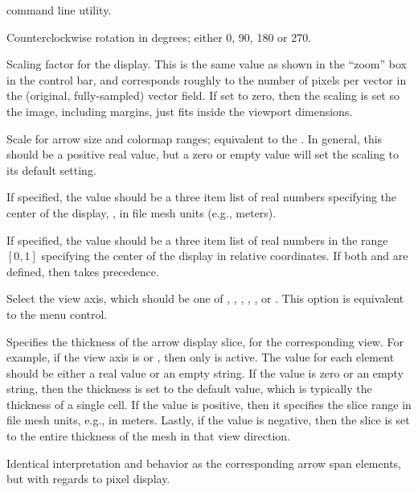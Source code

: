 \begin{description}
  command line
 utility.
\item[\optkey{misc,rotation}]
 Counterclockwise rotation in degrees; either 0, 90, 180 or 270.
\item[\optkey{misc,zoom}]
 Scaling factor for the display.  This is the same value as shown in the
 ``zoom'' box in the  control bar,
 and corresponds roughly to the number of pixels per vector in the
 (original, fully-sampled) vector field.  If set to zero, then
 the scaling is set so the image, including margins, just fits inside
 the viewport dimensions.
\item[\optkey{misc,datascale}]
 Scale for arrow size and colormap ranges; equivalent to the
 .  In general,
 this should be a positive real value, but a zero or empty value will
 set the scaling to its default setting.
\item[\optkey{misc,centerpt}]
 If specified, the value should be a three item list of real numbers
 specifying the center of the display, , in
 file mesh units (e.g., meters).
\item[\optkey{misc,relcenterpt}]
 If specified, the value should be a three item list of real numbers in
 the range $[0,1]$ specifying the center of the display in relative
 coordinates.  If both  and  are
 defined, then  takes precedence.
\item[\optkey{viewaxis}]
 Select the view axis, which should be one of , , ,
 , , or .  This option is equivalent to the
  menu control.
\item[\optkey{viewaxis,xarrowspan}, \optkey{viewaxis,yarrowspan},
      \optkey{viewaxis,zarrowspan}]
 Specifies the thickness of the arrow display slice, for the
 corresponding view.  For example, if the view axis is  or
 , then only  is active.  The value
 for each element should be either a real value or an empty string.  If
 the value is zero or an empty string, then the thickness is set to the
 default value, which is typically the thickness of a single cell.  If
 the value is positive, then it specifies the slice range in file mesh
 units, e.g., in meters.  Lastly, if the value is negative, then the
 slice is set to the entire thickness of the mesh in that view
 direction.
\item[\optkey{viewaxis,xpixelspan}, \optkey{viewaxis,ypixelspan},
      \optkey{viewaxis,zpixelspan}]
 Identical interpretation and behavior as the corresponding arrow span
 elements, but with regards to pixel display.
\end{description}

